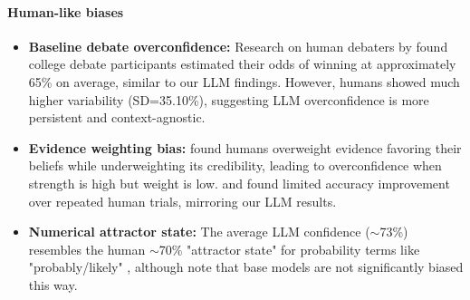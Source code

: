 \documentclass{article}
\begin{document}
\paragraph{Human-like biases}
\begin{itemize}
    \item \textbf{Baseline debate overconfidence:} Research on human debaters by \citet{RePEc:sip:dpaper:06-042} found college debate participants estimated their odds of winning at approximately 65\% on average, similar to our LLM findings. However, humans showed much higher variability (SD=35.10\%), suggesting LLM overconfidence is more persistent and context-agnostic.

    \item \textbf{Evidence weighting bias:} \citet{GriffinTversky1992} found humans overweight evidence favoring their beliefs while underweighting its credibility, leading to overconfidence when strength is high but weight is low. \citet{Moore2008} and \citet{RePEc:sip:dpaper:06-042} found limited accuracy improvement over repeated human trials, mirroring our LLM results.

    \item \textbf{Numerical attractor state:} The average LLM confidence ($\sim$73\%) resembles the human $\sim$70\% "attractor state" for probability terms like "probably/likely" \citep{Hashim2024,Mandel2019}, although \citep{west2025basemodelsbeataligned,openai2024gpt4technicalreport} note that base models are not significantly biased this way.
\end{itemize}
\end{document}
